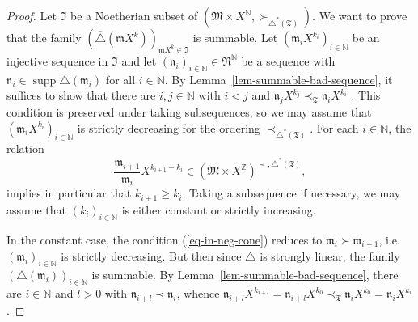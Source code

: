 \documentclass{article}
\newcommand{\tmop}[1]{\ensuremath{\operatorname{#1}}}
\theoremstyle{remark}\newtheorem*{convention*}{Convention}
\begin{document}
\begin{proof}
  Let $\mathfrak{I}$ be a Noetherian subset of $(\mathfrak{M} \times
  X^{\mathbb{N}}, \succ_{\triangle^{\ast} (\mathfrak{T})})$. We want to prove
  that the family $(\overline{\triangle} (\mathfrak{m}X^k))_{\mathfrak{m}X^k
  \in \mathfrak{I}}$ is summable. Let $(\mathfrak{m}_i X^{k_i})_{i \in
  \mathbb{N}}$ be an injective sequence in $\mathfrak{I}$ and let
  $(\mathfrak{n}_i)_{i \in \mathbb{N}} \in \mathfrak{N}^{\mathbb{N}}$ be a
  sequence with $\mathfrak{n}_i \in \tmop{supp} \triangle (\mathfrak{m}_i)$
  for all $i \in \mathbb{N}$. By Lemma~\ref{lem-summable-bad-sequence}, it suffices
  to show that there are $i, j \in \mathbb{N}$ with $i < j$ and
  $\mathfrak{n}_j X^{k_j} \prec_{\mathfrak{T}} \mathfrak{n}_i X^{k_i}$ . This
  condition is preserved under taking subsequences, so we may assume that
  $(\mathfrak{m}_i X^{k_i})_{i \in \mathbb{N}}$ is strictly decreasing for the
  ordering $\prec_{\triangle^{\ast} (\mathfrak{T})}$. For each $i \in
  \mathbb{N}$, the relation
  \begin{equation}
    \frac{\mathfrak{m}_{i + 1}}{\mathfrak{m}_i} X^{k_{i + 1} - k_i} \in
    (\mathfrak{M} \times X^{\mathbb{Z}})^{\prec, \triangle^{\ast}
    (\mathfrak{T})}, \label{eq-in-neg-cone}
  \end{equation}
  implies in particular that $k_{i + 1} \geqslant k_i$. Taking a subsequence
  if necessary, we may assume that $(k_i)_{i \in \mathbb{N}}$ is either
  constant or strictly increasing.
  
  In the constant case, the condition (\ref{eq-in-neg-cone}) reduces to
  $\mathfrak{m}_i \succ \mathfrak{m}_{i + 1}$, i.e. $(\mathfrak{m}_i)_{i \in
  \mathbb{N}}$ is strictly decreasing. But then since $\triangle$ is strongly
  linear, the family $(\triangle (\mathfrak{m}_i))_{i \in \mathbb{N}}$ is
  summable. By Lemma~\ref{lem-summable-bad-sequence}, there are $i \in \mathbb{N}$
  and $l > 0$ with $\mathfrak{n}_{i + l} \prec \mathfrak{n}_i$, whence
  $\mathfrak{n}_{i + l} X^{k_{i + l}} =\mathfrak{n}_{i + l} X^{k_0}
  \prec_{\mathfrak{T}} \mathfrak{n}_i X^{k_0} =\mathfrak{n}_i X^{k_i}$.
  

\end{proof}
\end{document}
